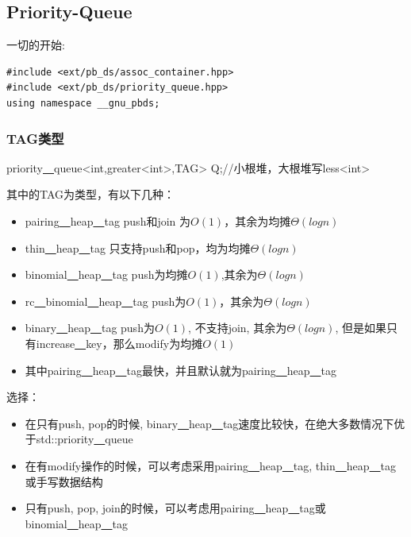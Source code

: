 \subsection{Priority-Queue}
一切的开始: 
\begin{lstlisting}
#include <ext/pb_ds/assoc_container.hpp>
#include <ext/pb_ds/priority_queue.hpp>
using namespace __gnu_pbds;
\end{lstlisting}

\subsubsection{TAG类型}
priority\underline{~~}queue<int,greater<int>,TAG> Q;//小根堆，大根堆写less<int> \par
其中的TAG为类型，有以下几种：\par
\begin{itemize}
\item pairing\underline{~~}heap\underline{~~}tag push和join 为$O(1)$，其余为均摊$\Theta(log n)$\par
\item thin\underline{~~}heap\underline{~~}tag 只支持push和pop，均为均摊$\Theta(logn)$\par
\item binomial\underline{~~}heap\underline{~~}tag push为均摊$O(1)$,其余为$\Theta(log n)$\par
\item rc\underline{~~}binomial\underline{~~}heap\underline{~~}tag push为$O(1)$，其余为$\Theta(log n)$\par
\item binary\underline{~~}heap\underline{~~}tag push为$O(1)$, 不支持join, 其余为$\Theta(log n)$, 但是如果只有increase\underline{~~}key，那么modify为均摊$O(1)$\par
\item 其中pairing\underline{~~}heap\underline{~~}tag最快，并且默认就为pairing\underline{~~}heap\underline{~~}tag\par
\end{itemize}

选择：
\begin{itemize}
\item 在只有push, pop的时候, binary\underline{~~}heap\underline{~~}tag速度比较快，在绝大多数情况下优于std::priority\underline{~~}queue
\item 在有modify操作的时候，可以考虑采用pairing\underline{~~}heap\underline{~~}tag, thin\underline{~~}heap\underline{~~}tag或手写数据结构
\item 只有push, pop, join的时候，可以考虑用pairing\underline{~~}heap\underline{~~}tag或binomial\underline{~~}heap\underline{~~}tag
\end{itemize}

